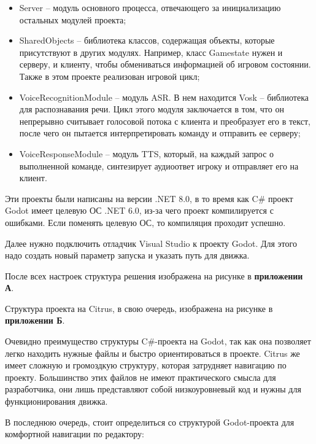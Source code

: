        \begin{itemize}
            \item Server -- модуль основного процесса, отвечающего за инициализацию остальных модулей проекта;

            \item SharedObjects -- библиотека классов, содержащая объекты, которые присутствуют в других модулях. Например, класс Gamestate нужен и серверу, и клиенту, чтобы обмениваться
            информацией об игровом состоянии. Также в этом проекте реализован игровой цикл;

            \item VoiceRecognitionModule -- модуль ASR. В нем находится Vosk -- библиотека для распознавания речи. Цикл этого модуля заключается в том, что он непрерывно считывает голосовой потока
            с клиента и преобразует его в текст, после чего он пытается интерпретировать команду и отправить ее серверу;

            \item VoiceResponseModule -- модуль TTS, который, на каждый запрос о выполненной команде, синтезирует аудиоответ игроку и отправляет его на клиент.
        \end{itemize}

        Эти проекты были написаны на версии .NET 8.0, в то время как C\# проект Godot имеет целевую ОС .NET 6.0, из-за чего проект компилируется с ошибками. Если поменять целевую ОС, то компиляция
        проходит успешно.

        Далее нужно подключить отладчик Visual Studio к проекту Godot. Для этого надо создать новый параметр запуска и указать путь для движка.
        
        После всех настроек структура решения изображена на рисунке в \textbf{приложении А}.

        Структура проекта на Citrus, в свою очередь, изображена на рисунке в \textbf{приложении Б}.


        Очевидно преимущество структуры C\#-проекта на Godot, так как она позволяет легко находить нужные файлы и быстро ориентироваться в проекте. Citrus же имеет сложную и громоздкую структуру, 
        которая затрудняет навигацию по проекту. Большинство этих файлов не имеют практического смысла для разработчика, они лишь представляют собой низкоуровневый код и нужны для функционирования 
        движка. 

        В последнюю очередь, стоит определиться со структурой Godot-проекта для комфортной навигации по редактору:

